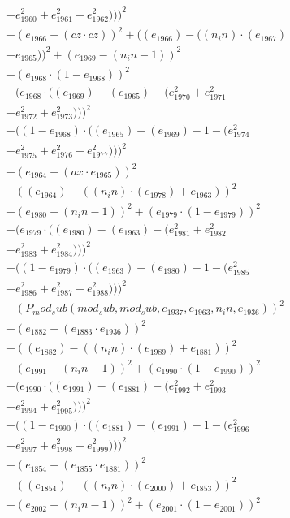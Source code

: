 \documentclass[10pt, a4paper]{article}
\begin{document}
\begin{align*}
& + e_{1960}^{2} + e_{1961}^{2} + e_{1962}^{2})))^{2} \\
& + (e_{1966} - (cz  \cdot  cz))^{2} + ((e_{1966}) - ((n_in)  \cdot  (e_{1967}) \\
& + e_{1965}))^{2} + (e_{1969} - (n_in - 1))^{2} \\
& + (e_{1968}  \cdot  (1 - e_{1968}))^{2} \\
& + (e_{1968}  \cdot  ((e_{1969}) - (e_{1965}) - (e_{1970}^{2} + e_{1971}^{2} \\
& + e_{1972}^{2} + e_{1973}^{2})))^{2} \\
& + ((1 - e_{1968})  \cdot  ((e_{1965}) - (e_{1969}) - 1 - (e_{1974}^{2} \\
& + e_{1975}^{2} + e_{1976}^{2} + e_{1977}^{2})))^{2} \\
& + (e_{1964} - (ax  \cdot  e_{1965}))^{2} \\
& + ((e_{1964}) - ((n_in)  \cdot  (e_{1978}) + e_{1963}))^{2} \\
& + (e_{1980} - (n_in - 1))^{2} + (e_{1979}  \cdot  (1 - e_{1979}))^{2} \\
& + (e_{1979}  \cdot  ((e_{1980}) - (e_{1963}) - (e_{1981}^{2} + e_{1982}^{2} \\
& + e_{1983}^{2} + e_{1984}^{2})))^{2} \\
& + ((1 - e_{1979})  \cdot  ((e_{1963}) - (e_{1980}) - 1 - (e_{1985}^{2} \\
& + e_{1986}^{2} + e_{1987}^{2} + e_{1988}^{2})))^{2} \\
& + (P_mod_sub(mod_sub, mod_sub, e_{1937}, e_{1963}, n_in, e_{1936}))^{2} \\
& + (e_{1882} - (e_{1883}  \cdot  e_{1936}))^{2} \\
& + ((e_{1882}) - ((n_in)  \cdot  (e_{1989}) + e_{1881}))^{2} \\
& + (e_{1991} - (n_in - 1))^{2} + (e_{1990}  \cdot  (1 - e_{1990}))^{2} \\
& + (e_{1990}  \cdot  ((e_{1991}) - (e_{1881}) - (e_{1992}^{2} + e_{1993}^{2} \\
& + e_{1994}^{2} + e_{1995}^{2})))^{2} \\
& + ((1 - e_{1990})  \cdot  ((e_{1881}) - (e_{1991}) - 1 - (e_{1996}^{2} \\
& + e_{1997}^{2} + e_{1998}^{2} + e_{1999}^{2})))^{2} \\
& + (e_{1854} - (e_{1855}  \cdot  e_{1881}))^{2} \\
& + ((e_{1854}) - ((n_in)  \cdot  (e_{2000}) + e_{1853}))^{2} \\
& + (e_{2002} - (n_in - 1))^{2} + (e_{2001}  \cdot  (1 - e_{2001}))^{2} \\

\end{align*}
\end{document}
